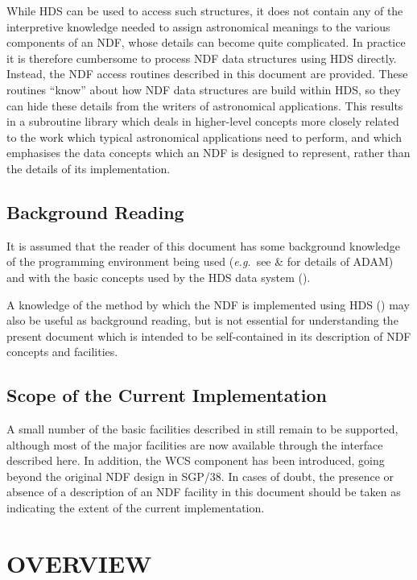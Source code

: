 \documentclass[twoside,11pt,nolof]{starlink}
\providecommand{\st}[1]{{\emph{#1}}}
\begin{document}
While HDS can be used to access such structures, it does not contain any of
the interpretive knowledge needed to assign astronomical meanings to the
various components of an NDF, whose details can become quite complicated.
In practice it is therefore cumbersome to process NDF data structures using
HDS directly.
Instead, the NDF access routines described in this document are provided.
These routines ``know'' about how NDF data structures are build within HDS,
so they can hide these details from the writers of astronomical
applications.
This results in a subroutine library which deals in higher-level concepts
more closely related to the work which typical astronomical applications
need to perform, and which emphasises the data concepts which an NDF is
designed to represent, rather than the details of its implementation.

\subsection{Background Reading}

It is assumed that the reader of this document has some background
knowledge of the programming environment being used (\st{e.g.}\ see
 \&  for details of ADAM)
and with the basic concepts used by the HDS data system
().

A knowledge of the method by which the NDF is implemented using HDS
() may also be useful as background reading, but
is not essential for understanding the present document which is
intended to be self-contained in its description of NDF concepts and
facilities.

\subsection{Scope of the Current Implementation}

A small number of the basic facilities described in
 still remain to be supported, although most of
the major facilities are now available through the interface described
here.  In addition, the WCS component has been introduced, going
beyond the original NDF design in SGP/38.  In cases of doubt, the
presence or absence of a description of an NDF facility in this
document should be taken as indicating the extent of the current
implementation.

\section{OVERVIEW}
\end{document}
